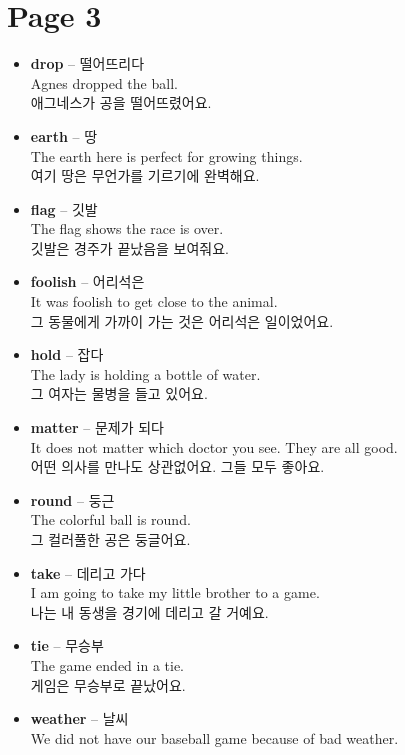 \documentclass[12pt]{article}
\begin{document}
\section*{Page 3}
\begin{itemize}
    \item \textbf{drop} -- 떨어뜨리다 \\
    Agnes dropped the ball. \\
    애그네스가 공을 떨어뜨렸어요.
    \item \textbf{earth} -- 땅 \\
    The earth here is perfect for growing things. \\
    여기 땅은 무언가를 기르기에 완벽해요.
    \item \textbf{flag} -- 깃발 \\
    The flag shows the race is over. \\
    깃발은 경주가 끝났음을 보여줘요.
    \item \textbf{foolish} -- 어리석은 \\
    It was foolish to get close to the animal. \\
    그 동물에게 가까이 가는 것은 어리석은 일이었어요.
    \item \textbf{hold} -- 잡다 \\
    The lady is holding a bottle of water. \\
    그 여자는 물병을 들고 있어요.
    \item \textbf{matter} -- 문제가 되다 \\
    It does not matter which doctor you see. They are all good. \\
    어떤 의사를 만나도 상관없어요. 그들 모두 좋아요.
    \item \textbf{round} -- 둥근 \\
    The colorful ball is round. \\
    그 컬러풀한 공은 둥글어요.
    \item \textbf{take} -- 데리고 가다 \\
    I am going to take my little brother to a game. \\
    나는 내 동생을 경기에 데리고 갈 거예요.
    \item \textbf{tie} -- 무승부 \\
    The game ended in a tie. \\
    게임은 무승부로 끝났어요.
    \item \textbf{weather} -- 날씨 \\
    We did not have our baseball game because of bad weather. \\

\end{itemize}
\end{document}
